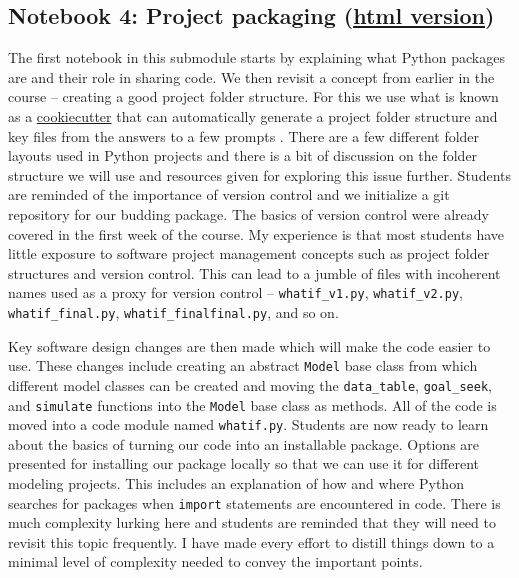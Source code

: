 \documentclass[ited,blindrev]{informs3}              %
\newcommand{\code}[1]{\texttt{#1}}
\begin{document}
\subsection{Notebook 4: Project packaging (\href{http://www.sba.oakland.edu/faculty/isken/excel_with_python/what_if_4_project_packaging.html}{html version})}

The first notebook in this submodule starts by explaining what Python packages are and their role in sharing code. We then revisit a concept from earlier in the course -- creating a good project folder structure. For this we use what is known as a \href{https://cookiecutter.readthedocs.io/en/stable/}{cookiecutter} that can automatically generate a project folder structure and key files from the answers to a few prompts \citep{audreyroyandcookiecuttercommunityCookiecutterBetterProject2012}. There are a few different folder layouts used in Python projects and there is a bit of discussion on the folder structure we will use and resources given for exploring this issue further. Students are reminded of the importance of version control and we initialize a git repository for our budding package. The basics of version control were already covered in the first week of the course. My experience is that most students have little exposure to software project management concepts such as project folder structures and version control. This can lead to a jumble of files with incoherent names used as a proxy for version control -- \code{whatif\_v1.py}, \code{whatif\_v2.py}, \code{whatif\_final.py}, \code{whatif\_finalfinal.py}, and so on.

Key software design changes are then made which will make the code easier to use. These changes include creating an abstract \code{Model} base class from which different model classes can be created and moving the \code{data\_table}, \code{goal\_seek}, and \code{simulate} functions into the \code{Model} base class as methods. All of the code is moved into a code module named \code{whatif.py}. Students are now ready to learn about the basics of turning our code into an installable package. Options are presented for installing our package locally so that we can use it for different modeling projects. This includes an explanation of how and where Python searches for packages when \code{import} statements are encountered in code. There is much complexity lurking here and students are reminded that they will need to revisit this topic frequently. I have made every effort to distill things down to a minimal level of complexity needed to convey the important points.
\end{document}
